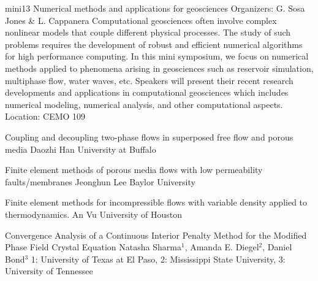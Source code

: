 \mini
{mini13}
{Numerical methods and applications for geosciences}
{Organizers: G. Sosa Jones \& L. Cappanera}
{Computational geosciences often involve complex nonlinear models that couple different physical processes. The study of such problems requires the development of robust and efficient numerical algorithms for high performance computing. In this mini symposium, we focus on numerical methods applied to phenomena arising in geosciences such as reservoir simulation, multiphase flow, water waves, etc. Speakers will present their recent research developments and applications in computational geosciences which includes numerical modeling, numerical analysis, and other computational aspects.}
{Location: CEMO 109}

\begin{talks}
\item\talk
{Coupling and decoupling two-phase flows in superposed free flow and porous media}
{Daozhi Han}
{University at Buffalo}
\item\talk
{Finite element methods of porous media flows with low permeability faults/membranes}
{Jeonghun Lee}
{Baylor University}
\item\talk
{Finite element methods for incompressible flows with variable density applied to thermodynamics.}
{An Vu}
{University of Houston}
\item\talk
{Convergence Analysis of a Continuous Interior Penalty Method for the Modified Phase Field Crystal Equation}
{Natasha Sharma$^{1}$, Amanda E. Diegel$^{2}$, Daniel Bond$^{3}$}
{1: University of Texas at El Paso, 2: Mississippi State University, 3: University of Tennessee}
\end{talks}
\room

